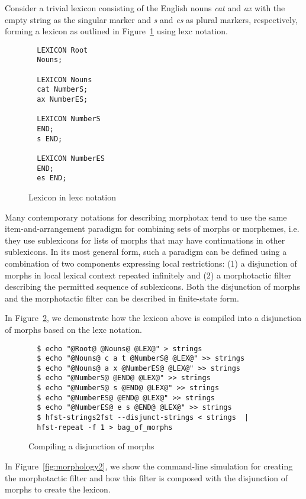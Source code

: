 \documentclass{llncs}
\begin{document}
Consider a trivial lexicon consisting of the English nouns \emph{cat} and \emph{ax} with
the empty string as the singular marker and \emph{s} and \emph{es} as plural markers, respectively,  
forming a lexicon as outlined in Figure~\ref{fig:morph0} using lexc notation.

\begin{figure} [h]
\begin{verbatim}
  LEXICON Root
  Nouns;

  LEXICON Nouns
  cat NumberS;
  ax NumberES;

  LEXICON NumberS
  END;
  s END;

  LEXICON NumberES
  END;
  es END;
\end{verbatim}
\caption{Lexicon in lexc notation}
\label{fig:morph0}
\end{figure}

Many contemporary notations for describing morphotax tend to use the same item-and-arrangement paradigm for
combining sets of morphs or morphemes, i.e. they use sublexicons for lists of morphs that may 
have continuations in other sublexicons. 
In its most general form, such a paradigm can be defined using a combination of two components expressing local restrictions:
(1) a disjunction of morphs in local lexical context repeated infinitely and 
(2) a morphotactic filter describing the permitted sequence of sublexicons.
Both the disjunction of morphs and the morphotactic filter can be described in finite-state form.

In Figure~\ref{fig:morphology1}, we demonstrate how the lexicon above is compiled into a disjunction of 
morphs based on the lexc notation.

\begin{figure} [h]
\begin{verbatim}
  $ echo "@Root@ @Nouns@ @LEX@" > strings
  $ echo "@Nouns@ c a t @NumberS@ @LEX@" >> strings
  $ echo "@Nouns@ a x @NumberES@ @LEX@" >> strings
  $ echo "@NumberS@ @END@ @LEX@" >> strings
  $ echo "@NumberS@ s @END@ @LEX@" >> strings
  $ echo "@NumberES@ @END@ @LEX@" >> strings
  $ echo "@NumberES@ e s @END@ @LEX@" >> strings
  $ hfst-strings2fst --disjunct-strings < strings  | 
  hfst-repeat -f 1 > bag_of_morphs
\end{verbatim}
\caption{Compiling a disjunction of morphs}
\label{fig:morphology1}
\end{figure}

In Figure~\ref{fig:morphology2}, we show the command-line simulation for creating the morphotactic filter and how this filter is composed with the disjunction of morphs to create the lexicon. 
\end{document}
